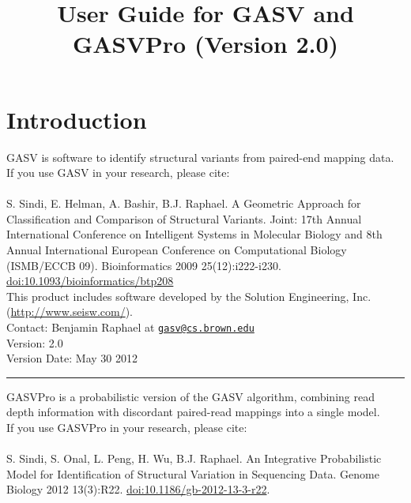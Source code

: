 \documentclass[11pt]{article}
\title{User Guide for GASV and GASVPro (Version 2.0)}
\date{}                                           %
\newcommand{\sectionline}{
  \nointerlineskip \vspace{\baselineskip}
  \hspace{\fill}\rule{0.3\linewidth}{.7pt}\hspace{\fill}
  \par\nointerlineskip \vspace{\baselineskip}
}
\begin{document}

\maketitle

\tableofcontents
\clearpage

\section{Introduction}

GASV is software to identify structural variants from paired-end mapping data. \\

\noindent If you use GASV in your research, please cite: \\ \\
S. Sindi, E. Helman, A. Bashir, B.J. Raphael. A Geometric Approach for
Classification and Comparison of Structural Variants. Joint: 17th
Annual International Conference on Intelligent Systems in Molecular
Biology and 8th Annual International European Conference on
Computational Biology (ISMB/ECCB 09).  Bioinformatics 2009
25(12):i222-i230. \href{http://dx.doi.org/10.1093/bioinformatics/btp208}{doi:10.1093/bioinformatics/btp208}\\

\noindent This product includes software developed by the Solution Engineering,
Inc. (\url{http://www.seisw.com/}).\\

\noindent Contact: Benjamin Raphael at \href{mailto:gasv@cs.brown.edu}{\nolinkurl{gasv@cs.brown.edu}}\\

\noindent Version: 2.0 \\
\noindent Version Date: May 30 2012 

\sectionline

\noindent GASVPro is a probabilistic version of the GASV algorithm, combining read depth information with discordant paired-read mappings into a single model. \\

\noindent If you use GASVPro in your research, please cite: \\ \\ 
S. Sindi, S. Onal, L. Peng, H. Wu, B.J. Raphael. An Integrative Probabilistic Model for Identification of Structural Variation in Sequencing Data. Genome Biology 2012 13(3):R22. \href{http://dx.doi.org/10.1186/gb-2012-13-3-r22}{doi:10.1186/gb-2012-13-3-r22}.\\
\end{document}
